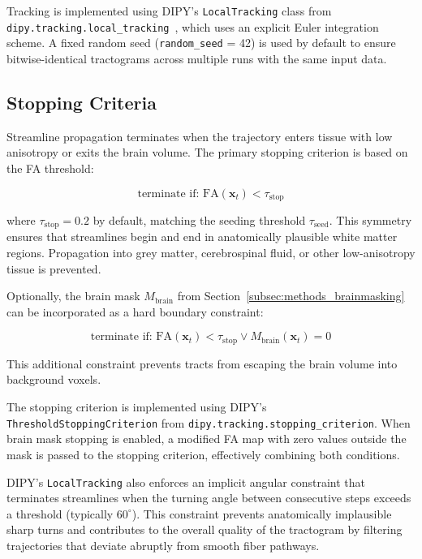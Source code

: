Tracking is implemented using DIPY's \texttt{LocalTracking} class from \texttt{dipy.tracking.local\_tracking}~\cite{garyfallidis_dipy_2014}, which uses an explicit Euler integration scheme. A fixed random seed (\texttt{random\_seed} = 42) is used by default to ensure bitwise-identical tractograms across multiple runs with the same input data. 

\subsection{Stopping Criteria}
\label{subsec:methods_stopping}

Streamline propagation terminates when the trajectory enters tissue with low anisotropy or exits the brain volume. The primary stopping criterion is based on the FA threshold:

\begin{equation}
	\text{terminate if: } \mathrm{FA}(\mathbf{x}_t) < \tau_{\text{stop}}
	\label{eq:stopping_criterion}
\end{equation}

where $\tau_{\text{stop}} = 0.2$ by default, matching the seeding threshold $\tau_{\text{seed}}$. This symmetry ensures that streamlines begin and end in anatomically plausible white matter regions. Propagation into grey matter, cerebrospinal fluid, or other low-anisotropy tissue is prevented.

Optionally, the brain mask $M_{\text{brain}}$ from Section~\ref{subsec:methods_brainmasking} can be incorporated as a hard boundary constraint:

\begin{equation}
	\text{terminate if: } \mathrm{FA}(\mathbf{x}_t) < \tau_{\text{stop}} \vee M_{\text{brain}}(\mathbf{x}_t) = 0
	\label{eq:stopping_criterion_mask}
\end{equation}

This additional constraint prevents tracts from escaping the brain volume into background voxels.

The stopping criterion is implemented using DIPY's \texttt{ThresholdStoppingCriterion} from \texttt{dipy.tracking.stopping\_criterion}. When brain mask stopping is enabled, a modified FA map with zero values outside the mask is passed to the stopping criterion, effectively combining both conditions.

DIPY's \texttt{LocalTracking} also enforces an implicit angular constraint that terminates streamlines when the turning angle between consecutive steps exceeds a threshold (typically $60^{\circ}$). This constraint prevents anatomically implausible sharp turns and contributes to the overall quality of the tractogram by filtering trajectories that deviate abruptly from smooth fiber pathways.

